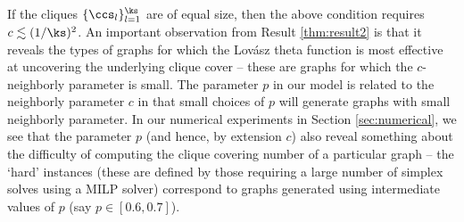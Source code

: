If the cliques $\{ \ccs_l \}_{l=1}^{\ks}$ are of equal size, then the above condition requires $c \lesssim (1/\ks)^2$.  An important observation from Result \ref{thm:result2} is that it reveals the types of graphs for which the Lov\'asz theta function is most effective at uncovering the underlying clique cover -- these are graphs for which the $c$-neighborly parameter is small.  The parameter $p$ in our model is related to the neighborly parameter $c$ in that small choices of $p$ will generate graphs with small neighborly parameter.  In our numerical experiments in Section \ref{sec:numerical}, we see that the parameter $p$ (and hence, by extension $c$) also reveal something about the difficulty of computing the clique covering number of a particular graph -- the `hard' instances (these are defined by those requiring a large number of simplex solves using a MILP solver) correspond to graphs generated using intermediate values of $p$ (say $p \in [ 0.6, 0.7]$).



%
%



